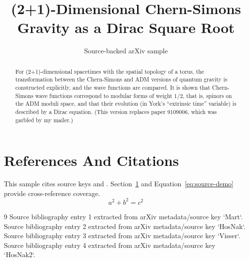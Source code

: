 \documentclass[11pt]{article}
\title{(2+1)-Dimensional Chern-Simons Gravity as a Dirac Square Root}
\author{Source-backed arXiv sample}
\date{}
\begin{document}
\maketitle
\begin{abstract}
For (2+1)-dimensional spacetimes with the spatial topology of a torus, the transformation between the Chern-Simons and ADM versions of quantum gravity is constructed explicitly, and the wave functions are compared. It is shown that Chern-Simons wave functions correspond to modular forms of weight 1/2, that is, spinors on the ADM moduli space, and that their evolution (in York's ``extrinsic time'' variable) is described by a Dirac equation. (This version replaces paper 9109006, which was garbled by my mailer.)
\end{abstract}
\section{References And Citations}
\label{sec:refs}
This sample cites source keys \cite{Mart} and \cite{HosNak}. Section~\ref{sec:refs} and Equation~\ref{eq:source-demo} provide cross-reference coverage.
\begin{equation}
\label{eq:source-demo}
a^2 + b^2 = c^2
\end{equation}
\begin{thebibliography}{9}
 Source bibliography entry 1 extracted from arXiv metadata/source key `Mart`.
 Source bibliography entry 2 extracted from arXiv metadata/source key `HosNak`.
 Source bibliography entry 3 extracted from arXiv metadata/source key `Visser`.
 Source bibliography entry 4 extracted from arXiv metadata/source key `HosNak2`.
\end{thebibliography}
\end{document}
